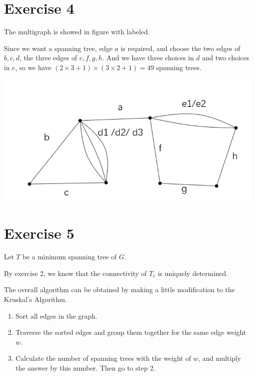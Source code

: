 \documentclass[
  11pt,
  a4paper,
]{article}
\begin{document}
\hypertarget{exercise-4}{%
\section{Exercise 4}\label{exercise-4}}

The multigraph is showed in figure with labeled.

Since we want a spanning tree, edge \(a\) is required, and choose the
two edges of \(b,c,d\), the three edges of \(e,f,g,h\). And we have
three choices in \(d\) and two choices in \(e\), so we have
\((2\times 3+1)\times(3\times 2+1)=49\) spanning trees.

\includegraphics{3.ex.4.png}

\hypertarget{exercise-5}{%
\section{Exercise 5}\label{exercise-5}}

Let \(T\) be a minimum spanning tree of \(G\).

By exercise 2, we know that the connectivity of \(T_c\) is uniquely
determined.

The overall algorithm can be obtained by making a little modification to
the Kruskal's Algorithm.

\begin{enumerate}
\def\labelenumi{\arabic{enumi}.}
\item
  Sort all edges in the graph.
\item
  Traverse the sorted edges and group them together for the same edge
  weight \(w\).
\item
  Calculate the number of spanning trees with the weight of \(w\), and
  multiply the answer by this number. Then go to step 2.
\end{enumerate}
\end{document}
